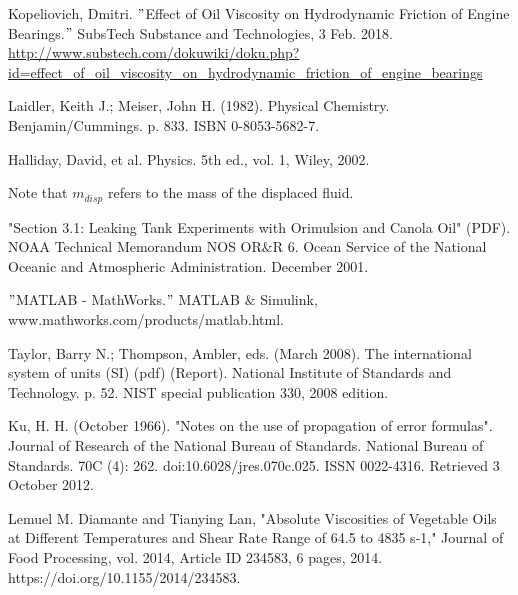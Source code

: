 \documentclass[aps,twocolumn,showpacs,preprintnumbers]{revtex4}
\begin{document}
\begin{thebibliography}{10}

 Kopeliovich, Dmitri. $"$Effect of Oil Viscosity on Hydrodynamic Friction of Engine Bearings.$"$ SubsTech Substance and Technologies, 3 Feb. 2018. \url{http://www.substech.com/dokuwiki/doku.php?id=effect_of_oil_viscosity_on_hydrodynamic_friction_of_engine_bearings}

 Laidler, Keith J.; Meiser, John H. (1982). Physical Chemistry. Benjamin/Cummings. p. 833. ISBN 0-8053-5682-7.

 Halliday, David, et al. Physics. 5th ed., vol. 1, Wiley, 2002.

 Note that $m_{disp}$ refers to the mass of the displaced fluid.

 "Section 3.1: Leaking Tank Experiments with Orimulsion and Canola Oil" (PDF). NOAA Technical Memorandum NOS OR$\&$R 6. Ocean Service of the National Oceanic and Atmospheric Administration. December 2001.

 $"$MATLAB - MathWorks.$"$ MATLAB $\&$ Simulink, www.mathworks.com/products/matlab.html.

 Taylor, Barry N.; Thompson, Ambler, eds. (March 2008). The international system of units (SI) (pdf) (Report). National Institute of Standards and Technology. p. 52. NIST special publication 330, 2008 edition.

  Ku, H. H. (October 1966). "Notes on the use of propagation of error formulas". Journal of Research of the National Bureau of Standards. National Bureau of Standards. 70C (4): 262. doi:10.6028/jres.070c.025. ISSN 0022-4316. Retrieved 3 October 2012.

 Lemuel M. Diamante and Tianying Lan, "Absolute Viscosities of Vegetable Oils at Different Temperatures and Shear Rate Range of 64.5 to 4835 s-1," Journal of Food Processing, vol. 2014, Article ID 234583, 6 pages, 2014. https://doi.org/10.1155/2014/234583.




\end{thebibliography}

\newpage
\end{document}
